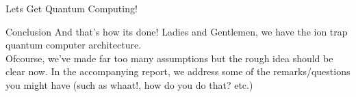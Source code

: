 \documentclass[final,hyperref={pdfpagelabels=false}]{beamer}
\begin{document}
\begin{frame}[t]
\begin{columns}[t]
\begin{column}{.465\textwidth}
\begin{block}{Lets Get Quantum Computing!}
     
\end{block}


\begin{block}{Conclusion}
	And that's how its done! Ladies and Gentlemen, we have the ion trap
	quantum computer architecture. \\
	Ofcourse, we've made far too many assumptions but the rough idea should
	be clear now. In the accompanying report, we address some of
	the remarks/questions you might have (such as whaat!, how do
	you do that? etc.)
\end{block}








\end{column}
\end{columns}
\end{frame}
\end{document}

